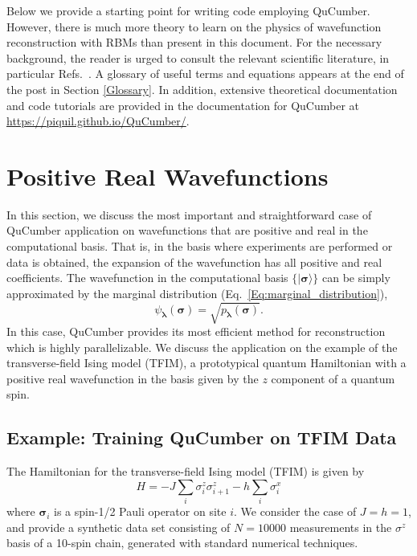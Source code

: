 \documentclass[submission, Phys]{SciPost}
\begin{document}
Below we provide a starting point for writing code employing QuCumber. 
However, there is much more theory to learn on the physics of wavefunction reconstruction with RBMs than present in this document. 
For the necessary background, the reader is urged to consult the relevant scientific literature, in particular Refs.~\cite{Torlai2016thermo, torlai2018tomography}.  
A glossary of useful terms and equations appears at the end of the post in Section \ref{Glossary}.
In addition, extensive theoretical documentation and code tutorials are provided in the documentation for QuCumber at \url{https://piquil.github.io/QuCumber/}. 


\section{Positive Real Wavefunctions}

In this section, we discuss the most important and straightforward case of QuCumber application on wavefunctions that are positive and real in the computational basis. 
That is, in the basis where experiments are performed or data is obtained, the expansion of the wavefunction has all positive and real coefficients. 
The wavefunction in the computational basis $\{ \vert\bm{\sigma}\rangle \}$ can be simply approximated by the marginal distribution (Eq.~\ref{Eq:marginal_distribution}), 
\begin{equation}
\psi_{\bm{\lambda}}(\bm{\sigma}) = \sqrt{p_{\bm{\lambda}} ( \bm{\sigma})}.  \label{PDwavef}
\end{equation}
In this case, QuCumber provides its most efficient method for reconstruction which is highly parallelizable.  
We discuss the application on the example of the transverse-field Ising model (TFIM), 
a prototypical quantum Hamiltonian with a positive real wavefunction in the basis given by the $z$ component of a quantum spin.


\subsection{Example: Training QuCumber on TFIM Data}
\label{Sec:Training_TFIM}

The Hamiltonian for the transverse-field Ising model (TFIM) is given by 
\begin{equation}
H = -J\sum_i {\sigma}^z_i {\sigma}^z_{i+1} - h \sum_i {\sigma}^x_{i} \label{TFIM}
\end{equation}
where ${\bm \sigma}_i$ is a spin-1/2 Pauli operator on site $i$.  We consider the case of $J=h=1$, and provide a synthetic data set consisting of  $N=10000$ measurements in the $\sigma^z$ basis of a 10-spin chain, generated with standard numerical techniques.
\end{document}
